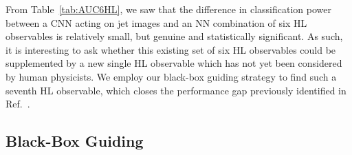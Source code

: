 \documentclass[aps,prd,twocolumn,superscriptaddress,preprintnumbers,nofootinbib,longbibliography,floatfix]{revtex4-1}
\newcommand{\rref}[1]{Ref.~\cite{#1}}
\newcommand{\Tab}[1]{Table~\ref{#1}}
\begin{document}
From \Tab{tab:AUC6HL}, we saw that the difference in classification power between a CNN acting on jet images and an NN combination of six HL observables is relatively small, but genuine and statistically significant. As such, it is interesting to ask whether this existing set of six HL observables could be supplemented by a new single HL observable which has not yet been considered by human physicists. We employ our black-box  guiding strategy to find such a seventh HL observable, which closes the performance gap previously identified in \rref{Baldi:2016fql}.

\subsection{Black-Box Guiding}
\label{subsec:supplementing_blackbox}
\end{document}
